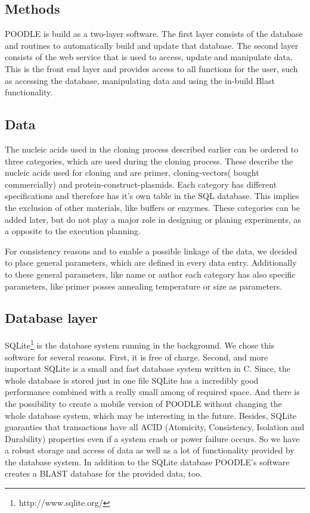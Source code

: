 \documentclass{bioinfo}
\begin{document}
\begin{methods}
\section{Methods}

POODLE is build as a two-layer software. The first layer consists of the database and routines to 
automatically build and update that database. The second layer consists of the web service that is 
used to access, update and manipulate data. This is the front end layer and provides access to all 
functions for the user, such as accessing the database, manipulating data and using the in-build 
Blast functionality.

\subsection{Data}
The nucleic acids used in the cloning process described earlier can be ordered to  three categories, 
which are used during the cloning process. These describe the nucleic acids used for cloning and 
are primer, cloning-vectors( bought commercially) and protein-construct-plasmids. Each category has 
different specifications and therefore has it's own table in the SQL database. This implies the 
exclusion of other materials, like buffers or enzymes. These categories can be added later, but do 
not play a major role in designing or planing experiments, as a opposite to the execution planning.

For consistency reasons and to enable a possible linkage of the data, we decided to place general 
parameters, which are defined in every data entry. Additionally to these general parameters, like 
name or author each category has also specific parameters, like primer posses annealing temperature 
or size as parameters.


\subsection{Database layer}

SQLite\footnote{http://www.sqlite.org/} is the database system running in the background. We chose 
this software for several reasons. First, it is free of charge. Second, and more important SQLite is 
a small and fast database system written in C. Since, the whole database is stored just in one file
SQLite has a incredibly good performance combined with a really small among of required space. And there 
is the possibility to create a mobile version of POODLE without changing the whole database system, 
which may be interesting in the future. Besides, 
SQLite guaranties that transactions have all ACID (Atomicity, Consistency, Isolation and Durability) properties even if a system crash or power failure occurs. So 
we have a robust storage and access of data as well as a lot of functionality provided by the database 
system. In addition to the SQLite database POODLE's software creates a BLAST database for the provided 
data, too. 


\end{methods}
\end{document}
